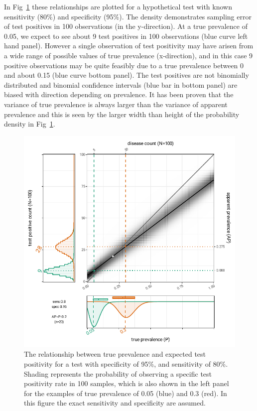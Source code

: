 \documentclass[a4paper, 12pt, twoside]{article}
\begin{document}
In Fig~\ref{fig:B1} these relationships are plotted for a hypothetical test with known sensitivity (80\%) and specificity (95\%). The density demonstrates sampling error of test positives in 100 observations (in the y-direction). At a true prevalence of 0.05, we expect to see about 9 test positives in 100 observations (blue curve left hand panel). However a single observation of test positivity may have arisen from a wide range of possible values of true prevalence (x-direction), and in this case 9 positive observations may be quite feasibly due to a true prevalence between 0 and about 0.15 (blue curve bottom panel). The test positives are not binomially distributed and binomial confidence intervals (blue bar in bottom panel) are biased with direction depending on prevalence. It has been proven that the variance of true prevalence is always larger than the variance of apparent prevalence \cite{rogan1978, lang2014} and this is seen by the larger width than height of the probability density in Fig~\ref{fig:B1}.

\begin{figure}[h!]
\centering
  \includegraphics{fig/rogan-gladen-v3}
  \caption{The relationship between true prevalence and expected test positivity for a test with specificity of 95\%, and sensitivity of 80\%. Shading represents the probability of observing a specific test positivity rate in 100 samples, which is also shown in the left panel for the examples of true prevalence of 0.05 (blue) and 0.3 (red). In this figure the exact sensitivity and specificity are assumed.}
\label{fig:B1}
\end{figure}
\end{document}
